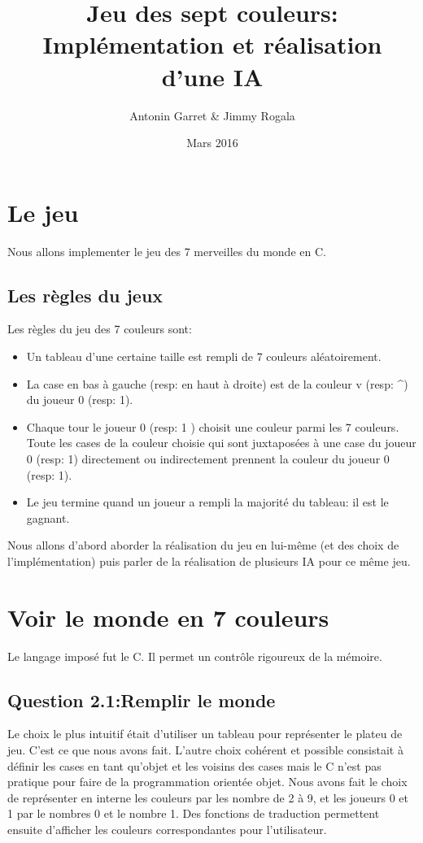 \documentclass{article}
\title{Jeu des sept couleurs: Implémentation et réalisation d'une IA}
\author{Antonin Garret & Jimmy Rogala}
\date{Mars 2016}
\begin{document}
\maketitle
\tableofcontents
\clearpage
\section{Le jeu}
Nous allons implementer le jeu des 7 merveilles du monde en C.

  \subsection{Les règles du jeux}
    Les règles du jeu des 7 couleurs sont:
    \begin{itemize} %
      \item Un tableau d'une certaine taille est rempli de 7 couleurs aléatoirement.
      \item La case en bas à gauche (resp: en haut à droite) est de la couleur v (resp: \textasciicircum ) du joueur 0 (resp: 1).
      \item Chaque tour le joueur 0 (resp: 1 ) choisit une couleur parmi les 7 couleurs. Toute les cases de la couleur choisie qui sont juxtaposées à une case du joueur 0 (resp: 1) directement ou indirectement prennent la couleur du joueur 0 (resp: 1).
      \item Le jeu termine quand un joueur a rempli la majorité du tableau: il est le gagnant.
    \end{itemize}

    Nous allons d'abord aborder la réalisation du jeu en lui-même (et des choix de l'implémentation) puis parler de la réalisation de plusieurs IA pour ce même jeu.


\section{Voir le monde en 7 couleurs}
    Le langage imposé fut le C. Il permet un contrôle rigoureux de la mémoire.

    \subsection*{Question 2.1:Remplir le monde}

      Le choix le plus intuitif était d'utiliser un tableau pour représenter le plateu de jeu. C'est ce que nous avons fait. L'autre choix cohérent et possible consistait à définir les cases en tant qu'objet et les voisins des cases mais le C n'est pas pratique pour faire de la programmation orientée objet.
      Nous avons fait le choix de représenter en interne les couleurs par les nombre de 2 à 9, et les joueurs 0 et 1 par le nombres 0 et le nombre 1. Des fonctions de traduction permettent ensuite d'afficher les couleurs correspondantes pour l'utilisateur.
\end{document}
